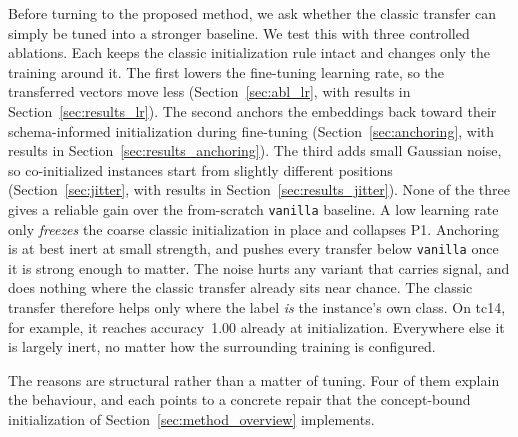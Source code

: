 \documentclass[a4paper,oneside,bibliography=totoc]{scrbook}
\begin{document}
Before turning to the proposed method, we ask whether the classic transfer can
simply be tuned into a stronger baseline. We test this with three controlled
ablations. Each keeps the classic initialization rule intact and changes only
the training around it. The first lowers the fine-tuning learning rate, so the
transferred vectors move less (Section~\ref{sec:abl_lr}, with results in
Section~\ref{sec:results_lr}). The second anchors the embeddings back toward
their schema-informed initialization during fine-tuning
(Section~\ref{sec:anchoring}, with results in Section~\ref{sec:results_anchoring}).
The third adds small Gaussian noise, so co-initialized instances start from
slightly different positions (Section~\ref{sec:jitter}, with results in
Section~\ref{sec:results_jitter}). None of the three gives a reliable gain over
the from-scratch \texttt{vanilla} baseline. A low learning rate only
\emph{freezes} the coarse classic initialization in place and collapses P1.
Anchoring is at best inert at small strength, and pushes every transfer below
\texttt{vanilla} once it is strong enough to matter. The noise hurts any variant
that carries signal, and does nothing where the classic transfer already sits
near chance. The classic transfer therefore helps only where the label \emph{is}
the instance's own class. On tc14, for example, it reaches accuracy~1.00 already
at initialization. Everywhere else it is largely inert, no matter how the
surrounding training is configured.

The reasons are structural rather than a matter of tuning. Four of them explain
the behaviour, and each points to a concrete repair that the concept-bound
initialization of Section~\ref{sec:method_overview} implements.
\end{document}

